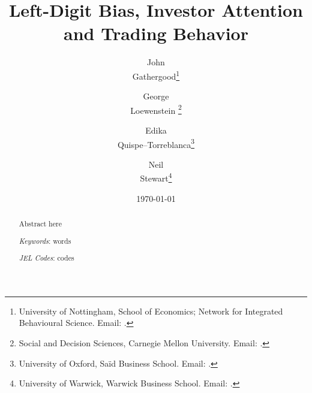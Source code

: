 
\title{\textbf{\Large{Left-Digit Bias, Investor Attention and Trading Behavior}}}

\singlespacing

\author{%
   John \\ Gathergood\thanks{University of Nottingham, School of Economics; Network for Integrated Behavioural Science. Email: .}%
   \and%
   George \\ Loewenstein%
   \thanks{Social and Decision Sciences, Carnegie Mellon University. Email: .}%
   \and%
   Edika \\ Quispe--Torreblanca\thanks{University of Oxford, Sa\"{i}d Business School. Email: .}%
    \and%
   Neil \\ Stewart\thanks{University of Warwick, Warwick Business School. Email: .}%
}

\date{%
	\vspace{1cm}\large%
	\today%
	\normalsize\\[1cm]%
}

\maketitle

\onehalfspacing

\begin{abstract}
   \noindent Abstract here
   
   \vspace{2ex}\noindent%
   \textit{Keywords}: words

   \vspace{.5ex}\noindent%
   \textit{JEL Codes}: codes%
\end{abstract}

\doublespacing
